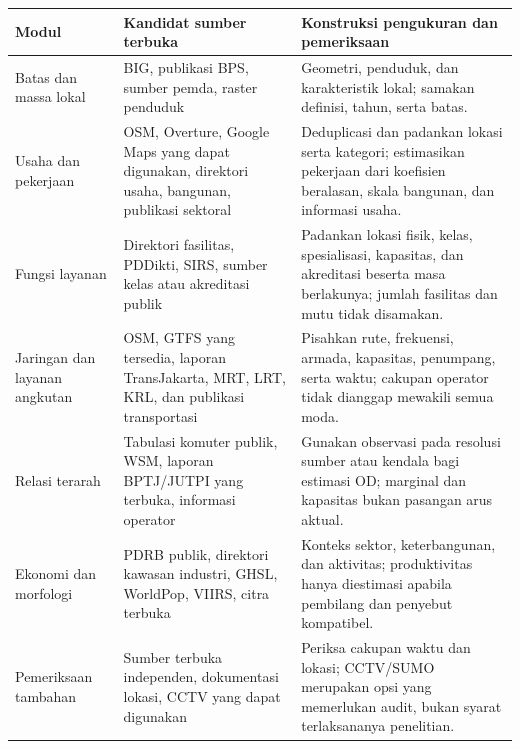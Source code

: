 \documentclass[
  indonesian,
  11pt,
  a4paper,
  oneside,
  openany]{report}
\newcounter{none} %
\begin{document}
{\def\LTcaptype{none} %
\begin{longtable}[]{@{}
  >{\raggedright\arraybackslash}p{}
  >{\raggedright\arraybackslash}p{}
  >{\raggedright\arraybackslash}p{}@{}}
\toprule\noalign{}
\begin{minipage}[b]{\linewidth}\raggedright
Modul
\end{minipage} & \begin{minipage}[b]{\linewidth}\raggedright
Kandidat sumber terbuka
\end{minipage} & \begin{minipage}[b]{\linewidth}\raggedright
Konstruksi pengukuran dan pemeriksaan
\end{minipage} \\
\midrule\noalign{}
\endhead
\bottomrule\noalign{}
\endlastfoot
Batas dan massa lokal & BIG, publikasi BPS, sumber pemda, raster
penduduk & Geometri, penduduk, dan karakteristik lokal; samakan
definisi, tahun, serta batas. \\
Usaha dan pekerjaan & OSM, Overture, Google Maps yang dapat digunakan,
direktori usaha, bangunan, publikasi sektoral & Deduplicasi dan padankan
lokasi serta kategori; estimasikan pekerjaan dari koefisien beralasan,
skala bangunan, dan informasi usaha. \\
Fungsi layanan & Direktori fasilitas, PDDikti, SIRS, sumber kelas atau
akreditasi publik & Padankan lokasi fisik, kelas, spesialisasi,
kapasitas, dan akreditasi beserta masa berlakunya; jumlah fasilitas dan
mutu tidak disamakan. \\
Jaringan dan layanan angkutan & OSM, GTFS yang tersedia, laporan
TransJakarta, MRT, LRT, KRL, dan publikasi transportasi & Pisahkan rute,
frekuensi, armada, kapasitas, penumpang, serta waktu; cakupan operator
tidak dianggap mewakili semua moda. \\
Relasi terarah & Tabulasi komuter publik, WSM, laporan BPTJ/JUTPI yang
terbuka, informasi operator & Gunakan observasi pada resolusi sumber
atau kendala bagi estimasi OD; marginal dan kapasitas bukan pasangan
arus aktual. \\
Ekonomi dan morfologi & PDRB publik, direktori kawasan industri, GHSL,
WorldPop, VIIRS, citra terbuka & Konteks sektor, keterbangunan, dan
aktivitas; produktivitas hanya diestimasi apabila pembilang dan penyebut
kompatibel. \\
Pemeriksaan tambahan & Sumber terbuka independen, dokumentasi lokasi,
CCTV yang dapat digunakan & Periksa cakupan waktu dan lokasi; CCTV/SUMO
merupakan opsi yang memerlukan audit, bukan syarat terlaksananya
penelitian. \\
\end{longtable}
}
\end{document}

